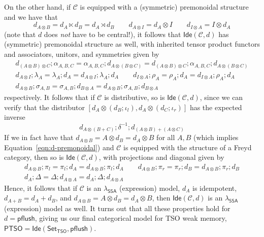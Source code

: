 \documentclass[acmsmall,screen,review]{acmart}
\newcommand{\mc}[1]{\ensuremath{\mathcal{#1}}}
\newcommand{\ms}[1]{\ensuremath{\mathsf{#1}}}
\newcommand{\isotopessa}{\(\lambda_{\ms{SSA}}\)}
\begin{document}
On the other hand, if $\mc{C}$ is equipped with a (symmetric) premonoidal structure and we have that
\begin{equation}
  d_{A \otimes B} = d_A \ltimes d_B = d_A \rtimes d_B 
  \qquad d_{A \otimes I} = d_A \otimes I 
  \qquad d_{I \otimes A} = I \otimes d_A
  \label{eqn:d-premonoidal}
\end{equation}
(note that $d$ does \emph{not} have to be central!), it follows that $\ms{Ide}(\mc{C},
d)$ has (symmetric) premonoidal structure as well, with inherited tensor product functors and
associators, unitors, and symmetries given by
\begin{equation}
  \begin{gathered}
    d_{(A \otimes B) \otimes C} ; \alpha_{A, B, C}
    = \alpha_{A, B, C} ; d_{A \otimes (B \otimes C)}
    = d_{(A \otimes B) \otimes C} ; \alpha_{A, B, C} ; d_{A \otimes (B \otimes C)} \\
    d_{A \otimes I} ; \lambda_A = \lambda_A ; d_A = d_{A \otimes I} ; \lambda_A ; d_A \qquad
    d_{I \otimes A} ; \rho_A = \rho_A ; d_A = d_{I \otimes A} ; \rho_A ; d_A \\
    d_{A \otimes B} ; \sigma_{A, B} 
      = \sigma_{A, B} ; d_{B \otimes A} 
      = d_{A \otimes B} ; \sigma_{A, B} ; d_{B \otimes A}
  \end{gathered}
\end{equation} 
respectively. It follows that if $\mc{C}$ is distributive, so is $\ms{Ide}(\mc{C}, d)$, since we can
verify that the distributor $[d_A \otimes (d_B ; \iota_l), d_A \otimes (d_C ; \iota_r)]$ has the
expected inverse
\begin{equation}
  d_{A \otimes (B + C)} ; \delta^{-1} ; d_{(A \otimes B) + (A \otimes C)}
\end{equation}
If we in fact have that $d_{A \otimes B} = A \otimes d_B = d_A \otimes B$ for all $A,
B$ (which implies Equation~\ref{eqn:d-premonoidal}) and $\mc{C}$ is equipped with the structure
of a Freyd category, then so is $\ms{Ide}(\mc{C}, d)$, with projections and diagonal given by
\begin{equation}
  \begin{gathered}
  d_{A \otimes B} ; \pi_l = \pi_l ; d_A = d_{A \otimes B} ; \pi_l ; d_A \qquad
  d_{A \otimes B} ; \pi_r = \pi_r ; d_B = d_{A \otimes B} ; \pi_r ; d_B \\
  d_A ; \Delta = \Delta ; d_{A \otimes A} = d_A ; \Delta ; d_{A \otimes A}
  \end{gathered}
\end{equation}
Hence, it follows that if $\mc{C}$ is an \isotopessa{} (expression) model, $d_A$ is idempotent,
$d_{A + B} = d_A + d_B$, and $d_{A \otimes B} = A \otimes d_B = d_A \otimes B$, then
$\ms{Ide}(\mc{C}, d)$ is an \isotopessa{} (expression) model as well. It turns out that all these
properties hold for $d = \ms{pflush}$, giving us our final categorical model for TSO weak memory,
$\ms{PTSO} = \ms{Ide}(\ms{Set}_{\ms{TSO}}, \ms{pflush})$.
\end{document}
